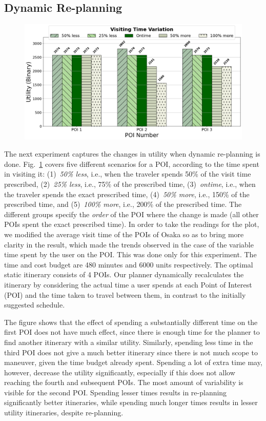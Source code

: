 \subsection{Dynamic Re-planning}

\begin{figure}[t]
    \centering
    \includegraphics[width=\figwidth]{plots/dynamic_pkj.png}
    \label{fig:dynamic}
\end{figure}

The next experiment captures the changes in utility when dynamic re-planning is done.
Fig.~\ref{fig:dynamic} covers five different scenarios for a POI, according to the time spent in visiting it: (1)~\emph{50\% less}, i.e., when the traveler spends 50\% of the visit time prescribed, (2)~\emph{25\% less}, i.e., 75\% of the prescribed time, (3)~\emph{ontime}, i.e., when the traveler spends the exact prescribed time, (4)~\emph{50\% more}, i.e., 150\% of the prescribed time, and (5)~\emph{100\% more}, i.e., 200\% of the prescribed time.
The different groups specify the \emph{order} of the POI where the change is made (all other POIs spent the exact prescribed time).
In order to take the readings for the plot, we modified the average visit time of the POIs of Osaka so as to bring more clarity in the result, which made the trends observed in the case of the variable time spent by the user on the POI.
This was done only for this experiment.
The time and cost budget are 480 minutes and 6000 units respectively.
The optimal static itinerary consists of 4 POIs.
Our planner dynamically recalculates the itinerary by considering the actual time a user spends at each Point of Interest (POI) and the time taken to travel between them, in contrast to the initially suggested schedule.

The figure shows that the effect of spending a substantially different time on the first POI does not have much effect, since there is enough time for the planner to find another itinerary with a similar utility.
Similarly, spending less time in the third POI does not give a much better itinerary since there is not much scope to maneuver, given the time budget already spent. Spending a lot of extra time may, however, decrease the utility significantly, especially if this does not allow reaching the fourth and subsequent POIs.
The most amount of variability is visible for the second POI.
Spending lesser times results in re-planning significantly better itineraries, while spending much longer times results in lesser utility itineraries, despite re-planning.

